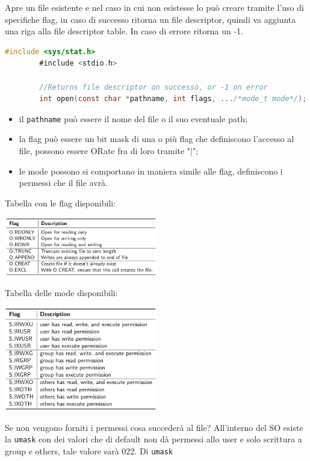 \documentclass[a4paper, 12pt]{book}
\begin{document}
    Apre un file esistente e nel caso in cui non esistesse 
    lo può creare tramite l'uso di specifiche flag, in caso di 
    successo ritorna un file descriptor, quindi va aggiunta 
    una riga alla file descriptor table. In caso di errore
    ritorna un -1.
    \begin{lstlisting}[language=C]
        #include <sys/stat.h>
        #include <stdio.h>

        //Returns file descriptor on successo, or -1 on error 
        int open(const char *pathname, int flags, .../*mode_t mode*/);
    \end{lstlisting}
    \begin{itemize}
        \item il \verb|pathname| può essere il nome del file o il suo eventuale path;
        \item la flag può essere un bit mask di una o più flag che definiscono l'accesso al file, possono essere ORate fra di loro tramite "|";
        \item le mode possono si comportano in maniera simile alle flag, definiscono i permessi che il file avrà.
    \end{itemize}
    Tabella con le flag disponibili:
    \begin{center}
        \includegraphics[width=0.5\textwidth]{flag_open.png}
    \end{center}
    Tabella delle mode disponibili:
    \begin{center}
        \includegraphics[width=0.5\textwidth]{mode_open.png}
    \end{center}
    Se non vengono forniti i permessi cosa succederà al file?
    All'interno del SO esiste la \verb|umask| con dei valori che 
    di default non dà permessi allo user e solo scrittura
    a group e others, tale valore sarà 022. Di \verb|umask|
\end{document}
